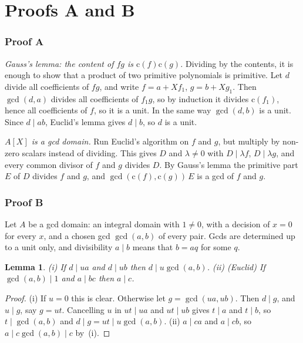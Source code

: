 \documentclass[11pt]{amsart}
\newtheorem{lemma}[theorem]{Lemma}
\theoremstyle{definition}
\theoremstyle{remark}
\newcommand{\cont}{\mathrm{c}}
\newcommand{\gcdd}{\operatorname{gcd}}
\begin{document}
\tableofcontents

\part{Proofs A and B}\label{part:AB}

\section{Proof A}

\emph{Gauss's lemma: the content of $fg$ is $\cont(f)\cont(g)$.}
Dividing by the contents, it is enough to show that a product of two
primitive polynomials is primitive. Let $d$ divide all coefficients of
$fg$, and write $f = a + Xf_1$, $g = b + Xg_1$. Then $\gcdd(d,a)$ divides
all coefficients of $f_1g$, so by induction it divides $\cont(f_1)$,
hence all coefficients of $f$, so it is a unit. In the same way
$\gcdd(d,b)$ is a unit. Since $d\mid ab$, Euclid's lemma gives $d\mid b$,
so $d$ is a unit.

\emph{$A[X]$ is a gcd domain.} Run Euclid's algorithm on $f$ and $g$, but
multiply by non-zero scalars instead of dividing. This gives $D$ and
$\lambda\neq0$ with $D\mid\lambda f$, $D\mid\lambda g$, and every common
divisor of $f$ and $g$ divides $D$. By Gauss's lemma the primitive part
$E$ of $D$ divides $f$ and $g$, and $\gcdd(\cont(f),\cont(g))\,E$ is a
gcd of $f$ and $g$.

\section{Proof B}

Let $A$ be a gcd domain: an integral domain with $1\neq0$, with a
decision of $x=0$ for every $x$, and a chosen gcd $\gcdd(a,b)$ of every
pair. Gcds are determined up to a unit only, and divisibility $a\mid b$
means that $b = aq$ for some $q$.

\begin{lemma}\label{lemB:M}
(i) If $d\mid ua$ and $d\mid ub$ then $d\mid u\gcdd(a,b)$.
(ii) (Euclid) If $\gcdd(a,b)\mid1$ and $a\mid bc$ then $a\mid c$.
\end{lemma}
\begin{proof}
(i) If $u=0$ this is clear. Otherwise let $g = \gcdd(ua,ub)$. Then
$d\mid g$, and $u\mid g$, say $g = ut$. Cancelling $u$ in $ut\mid ua$
and $ut\mid ub$ gives $t\mid a$ and $t\mid b$, so $t\mid\gcdd(a,b)$ and
$d\mid g = ut\mid u\gcdd(a,b)$.
(ii) $a\mid ca$ and $a\mid cb$, so $a\mid c\gcdd(a,b)\mid c$ by~(i).
\end{proof}
\end{document}
